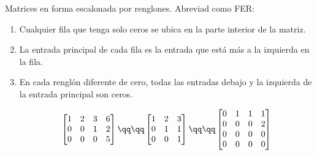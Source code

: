 Matrices en forma escalonada por renglones. Abreviad como FER: 
\begin{enumerate}
    \item Cualquier fila que tenga solo ceros se ubica en la parte interior de la matriz.
    \item La entrada principal de cada fila es la entrada que está más a la izquierda en la fila. 
    \item En cada renglón diferente de cero, todas las entradas debajo y la izquierda de la entrada principal son ceros.
        \begin{center}
           \begin{align*}
               \begin{bmatrix}
                   1&2&3&6 \\ 
                   0&0&1&2 \\ 
                   0&0&0&5 \\ 
               \end{bmatrix}
               \qq \qq 
               \begin{bmatrix}
                   1&2&3 \\ 
                   0&1&1 \\ 
                   0&0&1 \\ 
               \end{bmatrix}
               \qq \qq 
               \begin{bmatrix}
                    0&1&1&1 \\ 
                    0&0&0&2 \\ 
                    0&0&0&0 \\ 
                    0&0&0&0 \\ 
               \end{bmatrix}
           \end{align*}
        \end{center}
\end{enumerate}

